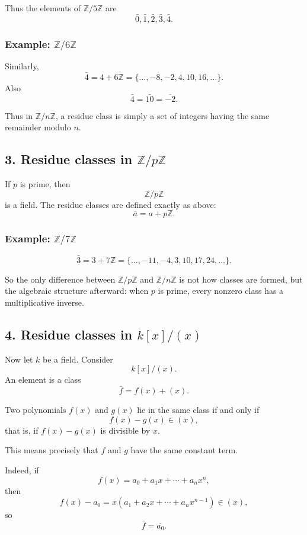 \documentclass[12pt,a4paper,oneside]{report}
\theoremstyle{notespace}
\begin{document}
	Thus the elements of \(\mathbb Z/5\mathbb Z\) are
	\[
	\bar 0,\bar 1,\bar 2,\bar 3,\bar 4.
	\]
	
	\subsubsection{Example: \(\mathbb Z/6\mathbb Z\)}
	
	Similarly,
	\[
	\bar 4=4+6\mathbb Z=\{\dots,-8,-2,4,10,16,\dots\}.
	\]
	Also
	\[
	\bar 4=\bar{10}=\overline{-2}.
	\]
	
	Thus in \(\mathbb Z/n\mathbb Z\), a residue class is simply a set of integers having the same remainder modulo \(n\).
	
	\subsection{3. Residue classes in \(\mathbb Z/p\mathbb Z\)}
	
	If \(p\) is prime, then
	\[
	\mathbb Z/p\mathbb Z
	\]
	is a field. The residue classes are defined exactly as above:
	\[
	\bar a=a+p\mathbb Z.
	\]
	
	\subsubsection{Example: \(\mathbb Z/7\mathbb Z\)}
	
	\[
	\bar 3=3+7\mathbb Z=\{\dots,-11,-4,3,10,17,24,\dots\}.
	\]
	
	So the only difference between \(\mathbb Z/p\mathbb Z\) and \(\mathbb Z/n\mathbb Z\) is not how classes are formed, but the algebraic structure afterward: when \(p\) is prime, every nonzero class has a multiplicative inverse.
	
	\subsection{4. Residue classes in \(k[x]/(x)\)}
	
	Now let \(k\) be a field. Consider
	\[
	k[x]/(x).
	\]
	An element is a class
	\[
	\bar f=f(x)+(x).
	\]
	
	Two polynomials \(f(x)\) and \(g(x)\) lie in the same class if and only if
	\[
	f(x)-g(x)\in (x),
	\]
	that is, if \(f(x)-g(x)\) is divisible by \(x\).
	
	This means precisely that \(f\) and \(g\) have the same constant term.
	
	Indeed, if
	\[
	f(x)=a_0+a_1x+\cdots+a_nx^n,
	\]
	then
	\[
	f(x)-a_0=x(a_1+a_2x+\cdots+a_nx^{n-1})\in (x),
	\]
	so
	\[
	\bar f=\overline{a_0}.
	\]
	
\end{document}
